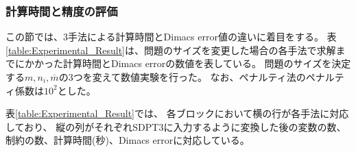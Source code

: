 \documentclass[11pt,a4paper,dvipdfmx,titlepage,uplatex]{jsarticle}
\theoremstyle{mystyle}
\newcommand{\0}{\mathbf{0}}
\begin{document}
\subsubsection{計算時間と精度の評価}\label{sec:Evaluation_CPUtime_and_accuracy}

この節では、3手法による計算時間とDimacs error値の違いに着目をする。
表\ref{table:Experimental_Result}は、問題のサイズを変更した場合の各手法で求解までにかかった計算時間とDimacs errorの数値を表している。
問題のサイズを決定する$m,n_i,\overline{m}$の3つを変えて数値実験を行った。
なお、ペナルティ法のペナルティ係数は$10^2$とした。

表\ref{table:Experimental_Result}では、%
各ブロックにおいて横の行が各手法に対応しており、
縦の列がそれぞれSDPT3に入力するように変換した後の変数の数、制約の数、計算時間(秒)、Dimacs errorに対応している。
\end{document}
